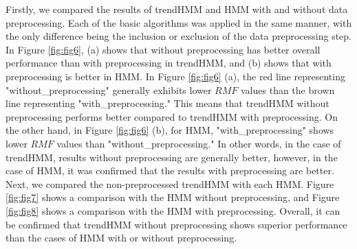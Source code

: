 \documentclass[preprint,12pt]{elsarticle}
\begin{document}
Firstly, we compared the results of trendHMM and HMM with and without data preprocessing. Each of the basic algorithms was applied in the same manner, with the only difference being the inclusion or exclusion of the data preprocessing step. In Figure \ref{fig:fig6}, (a) shows that without preprocessing has better overall performance than with preprocessing in trendHMM, and (b) shows that with preprocessing is better in HMM. 
In Figure \ref{fig:fig6} (a), the red line representing "without\_preprocessing" generally exhibits lower $RMF$ values than the brown line representing "with\_preprocessing." This means that trendHMM without preprocessing performs better compared to trendHMM with preprocessing. 
On the other hand, in Figure \ref{fig:fig6} (b), for HMM, "with\_preprocessing" shows lower $RMF$ values than "without\_preprocessing."
In other words, in the case of trendHMM, results without preprocessing are generally better, however, in the case of HMM, it was confirmed that the results with preprocessing are better. 
Next, we compared the non-preprocessed trendHMM with each HMM. Figure \ref{fig:fig7} shows a comparison with the HMM without preprocessing, and Figure \ref{fig:fig8} shows a comparison with the HMM with preprocessing. Overall, it can be confirmed that trendHMM without preprocessing shows superior performance than the cases of HMM with or without preprocessing.
\end{document}
